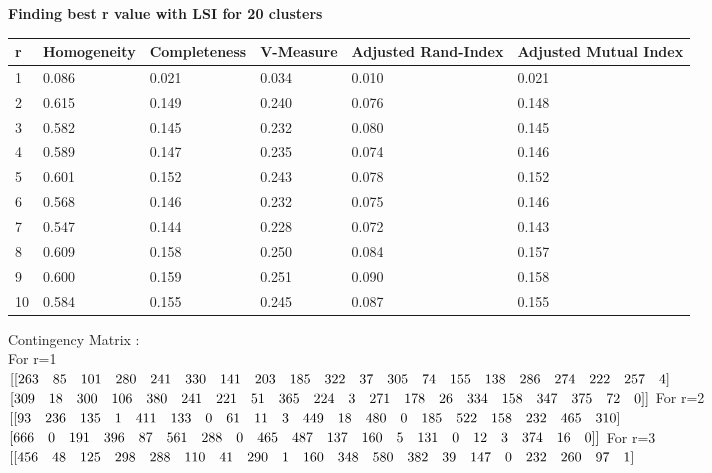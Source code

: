 \documentclass{article}
\begin{document}
\textbf{Finding best r value with LSI for 20 clusters}\\
\begin{center}
	\begin{tabular}{ | m{3cm}| m{2cm} | m{2cm} | m{2cm} | m{2cm} | m{2cm} | } 
		\hline
		r & Homogeneity& Completeness& V-Measure& Adjusted Rand-Index& Adjusted Mutual Index \\ 
		\hline
		1 & 0.086& 0.021& 0.034& 0.010& 0.021 \\ 
		\hline
		2 & 0.615& 0.149& 0.240& 0.076& 0.148 \\ 
		\hline
		3 & 0.582& 0.145& 0.232& 0.080& 0.145\\
		\hline
		4 & 0.589& 0.147& 0.235& 0.074& 0.146\\
		\hline
		5 & 0.601& 0.152& 0.243& 0.078& 0.152\\
		\hline
		6 & 0.568& 0.146& 0.232& 0.075& 0.146\\
		\hline
		7 & 0.547& 0.144& 0.228& 0.072& 0.143\\
		\hline
		8 & 0.609& 0.158& 0.250& 0.084& 0.157\\
		\hline
		9 & 0.600& 0.159& 0.251& 0.090& 0.158\\
		\hline
		10 & 0.584& 0.155& 0.245& 0.087& 0.155\\
		\hline
	\end{tabular}
\end{center}
Contingency Matrix : \\
For r=1\\ 
$[[263\quad  85\quad 101\quad 280\quad 241\quad 330\quad 141\quad 203\quad 185\quad 322\quad  37\quad 305\quad  74\quad 155\quad 138\quad 286\quad 274\quad 222\quad 257\quad 4]\\$
$[309\quad  18\quad 300\quad 106\quad 380\quad 241\quad 221\quad  51\quad 365\quad 224\quad   3\quad 271\quad 178\quad  26\quad 334\quad 158\quad 347\quad 375\quad 72\quad   0]]\\$
For r=2\\
$[[ 93\quad 236\quad 135\quad   1\quad 411\quad 133 \quad  0\quad  61 \quad 11 \quad  3\quad 449 \quad 18\quad 480 \quad  0\quad 185 \quad522\quad 158\quad 232\quad 465 \quad310]\\$
$[666 \quad  0 \quad191 \quad396 \quad 87\quad 561\quad 288 \quad  0 \quad465\quad 487\quad 137 \quad160\quad   5 \quad131\quad   0 \quad 12\quad   3 \quad374 \quad16 \quad 0]]\\$
For r=3\\
$[[456\quad  48\quad 125\quad 298 \quad288 \quad110 \quad 41\quad 290 \quad  1 \quad160\quad 348\quad 580 \quad382\quad  39\quad 147\quad   0\quad 232\quad 260\quad 97\quad   1]\\$
\end{document}
